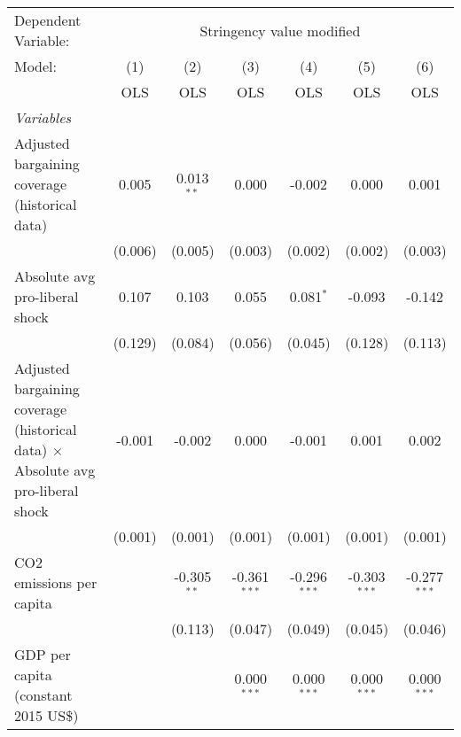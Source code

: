 
\begingroup
\centering
\begin{tabular}{lcccccc}
   \toprule
   Dependent Variable: & \multicolumn{6}{c}{Stringency value modified}\\
   Model:                                                                                  & (1)     & (2)           & (3)            & (4)            & (5)            & (6)\\  
                                                                                           &  OLS    & OLS           & OLS            & OLS            & OLS            & OLS\\  
   \midrule
   \emph{Variables}\\
   Adjusted bargaining coverage (historical data)                                          & 0.005   & 0.013$^{**}$  & 0.000          & -0.002         & 0.000          & 0.001\\   
                                                                                           & (0.006) & (0.005)       & (0.003)        & (0.002)        & (0.002)        & (0.003)\\   
   Absolute avg pro-liberal shock                                                          & 0.107   & 0.103         & 0.055          & 0.081$^{*}$    & -0.093         & -0.142\\   
                                                                                           & (0.129) & (0.084)       & (0.056)        & (0.045)        & (0.128)        & (0.113)\\   
   Adjusted bargaining coverage (historical data) $\times$ Absolute avg pro-liberal shock  & -0.001  & -0.002        & 0.000          & -0.001         & 0.001          & 0.002\\   
                                                                                           & (0.001) & (0.001)       & (0.001)        & (0.001)        & (0.001)        & (0.001)\\   
   CO2 emissions per capita                                                                &         & -0.305$^{**}$ & -0.361$^{***}$ & -0.296$^{***}$ & -0.303$^{***}$ & -0.277$^{***}$\\   
                                                                                           &         & (0.113)       & (0.047)        & (0.049)        & (0.045)        & (0.046)\\   
   GDP per capita (constant 2015 US\$)                                                     &         &               & 0.000$^{***}$  & 0.000$^{***}$  & 0.000$^{***}$  & 0.000$^{***}$\\   

\end{tabular}
